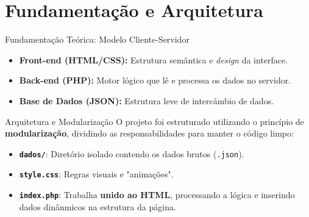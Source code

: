 \documentclass[10pt, aspectratio=169]{beamer}
\begin{document}
\section{Fundamentação e Arquitetura}


\begin{frame}{Fundamentação Teórica: Modelo Cliente-Servidor}
    \centering
    
    \vspace{1cm}
    \begin{itemize}
        \item \textbf{Front-end (HTML/CSS):} Estrutura semântica e \textit{design} da interface.
        \item \textbf{Back-end (PHP):} Motor lógico que lê e processa os dados no servidor.
        \item \textbf{Base de Dados (JSON):} Estrutura leve de intercâmbio de dados.
    \end{itemize}
\end{frame}

\begin{frame}{Arquitetura e Modularização}
    O projeto foi estruturado utilizando o princípio de \textbf{modularização}, dividindo as responsabilidades para manter o código limpo:
    
    \vspace{0.5cm}
    \begin{itemize}
        \item \textbf{\texttt{dados/}}: Diretório isolado contendo os dados brutos (\texttt{.json}).
        \item \textbf{\texttt{style.css}}: Regras visuais e "animações".
        \item \textbf{\texttt{index.php}}: Trabalha \textbf{unido ao HTML}, processando a lógica e inserindo dados dinânmicos na estrutura da página.
    \end{itemize}
\end{frame}
\end{document}
